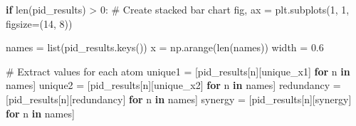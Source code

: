 \documentclass[
  11pt,
  letterpaper,
  oneside,
  openany]{book}
\newenvironment{Shaded}{\begin{snugshade}}{\end{snugshade}}
\newcommand{\BuiltInTok}[1]{\textcolor[rgb]{0.00,0.23,0.31}{#1}}
\newcommand{\CommentTok}[1]{\textcolor[rgb]{0.37,0.37,0.37}{#1}}
\newcommand{\ControlFlowTok}[1]{\textcolor[rgb]{0.00,0.23,0.31}{\textbf{#1}}}
\newcommand{\DecValTok}[1]{\textcolor[rgb]{0.68,0.00,0.00}{#1}}
\newcommand{\FloatTok}[1]{\textcolor[rgb]{0.68,0.00,0.00}{#1}}
\newcommand{\KeywordTok}[1]{\textcolor[rgb]{0.00,0.23,0.31}{\textbf{#1}}}
\newcommand{\NormalTok}[1]{\textcolor[rgb]{0.00,0.23,0.31}{#1}}
\newcommand{\OperatorTok}[1]{\textcolor[rgb]{0.37,0.37,0.37}{#1}}
\newcommand{\StringTok}[1]{\textcolor[rgb]{0.13,0.47,0.30}{#1}}
\begin{document}
\begin{Shaded}
\begin{Highlighting}[]
\ControlFlowTok{if} \BuiltInTok{len}\NormalTok{(pid\_results) }\OperatorTok{\textgreater{}} \DecValTok{0}\NormalTok{:}
    \CommentTok{\# Create stacked bar chart}
\NormalTok{    fig, ax }\OperatorTok{=}\NormalTok{ plt.subplots(}\DecValTok{1}\NormalTok{, }\DecValTok{1}\NormalTok{, figsize}\OperatorTok{=}\NormalTok{(}\DecValTok{14}\NormalTok{, }\DecValTok{8}\NormalTok{))}

\NormalTok{    names }\OperatorTok{=} \BuiltInTok{list}\NormalTok{(pid\_results.keys())}
\NormalTok{    x }\OperatorTok{=}\NormalTok{ np.arange(}\BuiltInTok{len}\NormalTok{(names))}
\NormalTok{    width }\OperatorTok{=} \FloatTok{0.6}

    \CommentTok{\# Extract values for each atom}
\NormalTok{    unique1 }\OperatorTok{=}\NormalTok{ [pid\_results[n][}\StringTok{\textquotesingle{}unique\_x1\textquotesingle{}}\NormalTok{] }\ControlFlowTok{for}\NormalTok{ n }\KeywordTok{in}\NormalTok{ names]}
\NormalTok{    unique2 }\OperatorTok{=}\NormalTok{ [pid\_results[n][}\StringTok{\textquotesingle{}unique\_x2\textquotesingle{}}\NormalTok{] }\ControlFlowTok{for}\NormalTok{ n }\KeywordTok{in}\NormalTok{ names]}
\NormalTok{    redundancy }\OperatorTok{=}\NormalTok{ [pid\_results[n][}\StringTok{\textquotesingle{}redundancy\textquotesingle{}}\NormalTok{] }\ControlFlowTok{for}\NormalTok{ n }\KeywordTok{in}\NormalTok{ names]}
\NormalTok{    synergy }\OperatorTok{=}\NormalTok{ [pid\_results[n][}\StringTok{\textquotesingle{}synergy\textquotesingle{}}\NormalTok{] }\ControlFlowTok{for}\NormalTok{ n }\KeywordTok{in}\NormalTok{ names]}


\end{Highlighting}
\end{Shaded}
\end{document}
